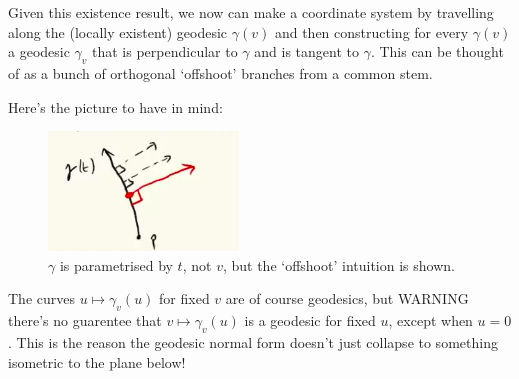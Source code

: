 \documentclass[11pt]{scrartcl}
\begin{document}
Given this existence result, we now can make a coordinate system by travelling along the (locally existent) geodesic $\gamma(v)$ and then constructing for every $\gamma(v)$ a geodesic $\gamma_v$ that is perpendicular to $\gamma$ and is tangent to $\gamma$. This can be thought of as a bunch of orthogonal `offshoot' branches from a common stem.

Here's the picture to have in mind:

\begin{figure}[h]
\centering
\includegraphics[scale=0.5]{Selection_253.png}
\caption{$\gamma$ is parametrised by $t$, not $v$, but the `offshoot' intuition is shown.}
\label{fig:offshoot}
\end{figure}

\begin{remark}
The curves $u \mapsto \gamma_v(u)$ for fixed $v$ are of course geodesics, but WARNING there's no guarentee that $v \mapsto \gamma_v(u)$ is a geodesic for fixed $u$, except when $u=0$. This is the reason the geodesic normal form doesn't just collapse to something isometric to the plane below!
\end{remark}

\end{document}
